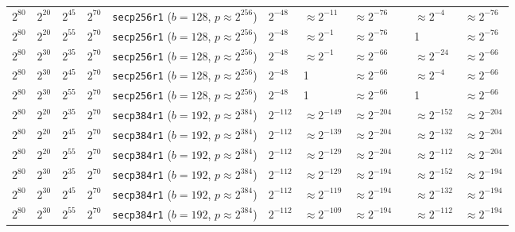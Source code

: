 \begin{table}[p]
\begin{tabular}{@{}lllllllllll@{}}
$2^{80}$	&$2^{20}$	&$2^{45}$	&$2^{70}$	&\texttt{secp256r1} ($b \!=\! 128$,\! $p \!\approx\! 2^{256}$)	&$2^{-48}$	&\cellcolor{red!25}$\approx 2^{-11}$	&$\approx 2^{-76}$	&& \cellcolor{red!25}$\approx 2^{-4}$	&$\approx 2^{-76}$	 \\
$2^{80}$	&$2^{20}$	&$2^{55}$	&$2^{70}$	&\texttt{secp256r1} ($b \!=\! 128$,\! $p \!\approx\! 2^{256}$)	&$2^{-48}$	&\cellcolor{red!25}$\approx 2^{-1}$	&$\approx 2^{-76}$	&& \cellcolor{red!25}1			&$\approx 2^{-76}$	 \\
$2^{80}$	&$2^{30}$	&$2^{35}$	&$2^{70}$	&\texttt{secp256r1} ($b \!=\! 128$,\! $p \!\approx\! 2^{256}$)	&$2^{-48}$	&\cellcolor{red!25}$\approx 2^{-1}$	&$\approx 2^{-66}$	&& \cellcolor{red!25}$\approx 2^{-24}$	&$\approx 2^{-66}$	 \\
$2^{80}$	&$2^{30}$	&$2^{45}$	&$2^{70}$	&\texttt{secp256r1} ($b \!=\! 128$,\! $p \!\approx\! 2^{256}$)	&$2^{-48}$	&\cellcolor{red!25}1			&$\approx 2^{-66}$	&& \cellcolor{red!25}$\approx 2^{-4}$	&$\approx 2^{-66}$	 \\
$2^{80}$	&$2^{30}$	&$2^{55}$	&$2^{70}$	&\texttt{secp256r1} ($b \!=\! 128$,\! $p \!\approx\! 2^{256}$)	&$2^{-48}$	&\cellcolor{red!25}1			&$\approx 2^{-66}$	&& \cellcolor{red!25}1			&$\approx 2^{-66}$	 \\
\midrule
$2^{80}$	&$2^{20}$	&$2^{35}$	&$2^{70}$	&\texttt{secp384r1} ($b \!=\! 192$,\! $p \!\approx\! 2^{384}$)	&$2^{-112}$	&$\approx 2^{-149}$	& $\approx 2^{-204}$	&& $\approx 2^{-152}$	& $\approx 2^{-204}$	 \\
$2^{80}$	&$2^{20}$	&$2^{45}$	&$2^{70}$	&\texttt{secp384r1} ($b \!=\! 192$,\! $p \!\approx\! 2^{384}$)	&$2^{-112}$	&$\approx 2^{-139}$	& $\approx 2^{-204}$	&& $\approx 2^{-132}$	& $\approx 2^{-204}$	 \\
$2^{80}$	&$2^{20}$	&$2^{55}$	&$2^{70}$	&\texttt{secp384r1} ($b \!=\! 192$,\! $p \!\approx\! 2^{384}$)	&$2^{-112}$	&$\approx 2^{-129}$	& $\approx 2^{-204}$	&& \cellcolor{orange!25}$\approx 2^{-112}$	&$\approx 2^{-204}$	 \\
$2^{80}$	&$2^{30}$	&$2^{35}$	&$2^{70}$	&\texttt{secp384r1} ($b \!=\! 192$,\! $p \!\approx\! 2^{384}$)	&$2^{-112}$	&$\approx 2^{-129}$	& $\approx 2^{-194}$	&& $\approx 2^{-152}$	& $\approx 2^{-194}$	 \\
$2^{80}$	&$2^{30}$	&$2^{45}$	&$2^{70}$	&\texttt{secp384r1} ($b \!=\! 192$,\! $p \!\approx\! 2^{384}$)	&$2^{-112}$	&$\approx 2^{-119}$	& $\approx 2^{-194}$	&& $\approx 2^{-132}$	& $\approx 2^{-194}$	 \\
$2^{80}$	&$2^{30}$	&$2^{55}$	&$2^{70}$	&\texttt{secp384r1} ($b \!=\! 192$,\! $p \!\approx\! 2^{384}$)	&$2^{-112}$	&\cellcolor{red!25}$\approx 2^{-109}$	&$\approx 2^{-194}$	&& \cellcolor{orange!25}$\approx 2^{-112}$	&$\approx 2^{-194}$	 \\

\end{tabular}
\end{table}
